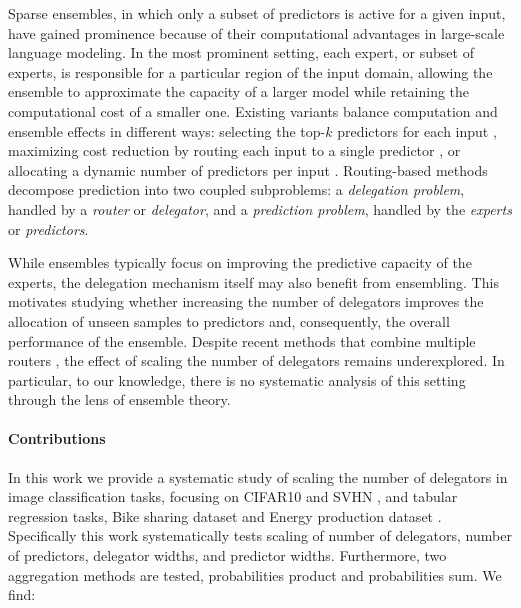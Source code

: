 \documentclass[10pt]{article} %
\begin{document}
Sparse ensembles, in which only a subset of predictors is active for a given input, have gained prominence because of their computational advantages in large-scale language modeling. In the most prominent setting, each expert, or subset of experts, is responsible for a particular region of the input domain, allowing the ensemble to approximate the capacity of a larger model while retaining the computational cost of a smaller one. Existing variants balance computation and ensemble effects in different ways: selecting the top-$k$ predictors for each input \citep{shazeer2017outrageously}, maximizing cost reduction by routing each input to a single predictor \citep{fedus2022switch}, or allocating a dynamic number of predictors per input \citep{wang2025remoe}. Routing-based methods decompose prediction into two coupled subproblems: a \textit{delegation problem}, handled by a \textit{router} or \textit{delegator}, and a \textit{prediction problem}, handled by the \textit{experts} or \textit{predictors}.

While ensembles typically focus on improving the predictive capacity of the experts, the delegation mechanism itself may also benefit from ensembling. This motivates studying whether increasing the number of delegators improves the allocation of unseen samples to predictors and, consequently, the overall performance of the ensemble. Despite recent methods that combine multiple routers \citep{zhang2025mixture, ran2025router}, the effect of scaling the number of delegators remains underexplored. In particular, to our knowledge, there is no systematic analysis of this setting through the lens of ensemble theory.

\paragraph{Contributions} In this work we provide a systematic study of scaling the number of delegators in image classification tasks, focusing on CIFAR10 \citep{krizhevsky2009learning} and SVHN \citep{netzer2011reading}, and tabular regression tasks, Bike sharing dataset \citep{bike_sharing_275} and Energy production dataset \citep{energydataset}. Specifically this work systematically tests scaling of number of delegators, number of predictors, delegator widths, and predictor widths. Furthermore, two aggregation methods are tested, probabilities product and probabilities sum. We find:
\end{document}
